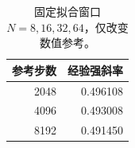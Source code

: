\begin{table}[H]\centering\small
\caption{固定拟合窗口 $N=8,16,32,64$，仅改变数值参考。}\label{tab:reference-slopes}
\begin{tabular}{rr}\toprule
参考步数 & 经验强斜率\\\midrule
2048 & 0.496108\\
4096 & 0.493008\\
8192 & 0.491450\\
\bottomrule\end{tabular}
\end{table}
